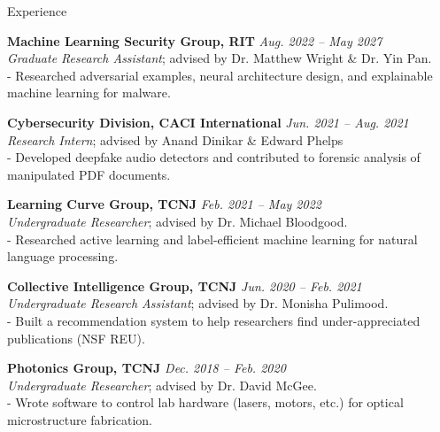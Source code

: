\documentclass{cv} %
\begin{document}
\begin{rSection}{Experience}

{\bf Machine Learning Security Group, RIT}  \hfill {\em Aug. 2022 -- May 2027}
\\{\textit{Graduate Research Assistant}; advised by Dr. Matthew Wright \& Dr. Yin Pan.}
\\- Researched adversarial examples, neural architecture design, and explainable machine learning for malware.

{\bf Cybersecurity Division, CACI International} \hfill {\em Jun. 2021 -- Aug. 2021}
\\{\textit{Research Intern}}; advised by Anand Dinikar \& Edward Phelps
\\- Developed deepfake audio detectors and contributed to forensic analysis of manipulated PDF documents.

{\bf Learning Curve Group, TCNJ} \hfill {\em Feb. 2021 -- May 2022}
\\{\textit{Undergraduate Researcher}; advised by Dr. Michael Bloodgood.}
\\- Researched active learning and label-efficient machine learning for natural language processing.

{\bf Collective Intelligence Group, TCNJ} \hfill {\em Jun. 2020 -- Feb. 2021}
\\{\textit{Undergraduate Research Assistant}; advised by Dr. Monisha Pulimood.}
\\- Built a recommendation system to help researchers find under-appreciated publications (NSF REU).

{\bf Photonics Group, TCNJ} \hfill {\em Dec. 2018 -- Feb. 2020}
\\{\textit{Undergraduate Researcher}; advised by Dr. David McGee.}
\\- Wrote software to control lab hardware (lasers, motors, etc.) for optical microstructure fabrication.
\end{rSection}
\end{document}
